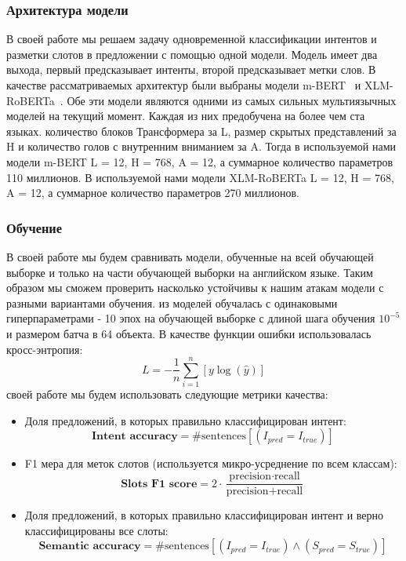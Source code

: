 \subsubsection{Архитектура модели}
В своей работе мы решаем задачу одновременной классификации интентов и разметки слотов в предложении с помощью одной модели.
Модель имеет два выхода, первый предсказывает интенты, второй предсказывает метки слов.
В качестве рассматриваемых архитектур были выбраны модели m-BERT~\cite{devlin-etal-2019-bert} и XLM-RoBERTa~\cite{Conneau2020UnsupervisedCR}.
Обе эти модели являются одними из самых сильных мультиязычных моделей на текущий момент.
Каждая из них предобучена на более чем ста языках.
 количество блоков Трансформера за L, размер скрытых представлений за H и количество голов с внутренним вниманием за A\@.
Тогда в используемой нами модели m-BERT L = 12, H = 768, A = 12, а суммарное количество параметров 110 миллионов.
В используемой нами модели XLM-RoBERTa L = 12, H = 768, A = 12, а суммарное количество параметров 270 миллионов.

\subsubsection{Обучение}
В своей работе мы будем сравнивать модели, обученные на всей обучающей выборке и только на части обучающей выборки на английском языке.
Таким образом мы сможем проверить насколько устойчивы к нашим атакам модели с разными вариантами обучения.
 из моделей обучалась с одинаковыми гиперпараметрами - 10 эпох на обучающей выборке с длиной шага обучения $10^{-5}$ и размером батча в 64 объекта.
В качестве функции ошибки использовалась кросс-энтропия:
\begin{equation}
    L = -\dfrac{1}{n}\sum\limits_{i = 1}^{n}\left[ y\log\left(\hat{y}\right) \right]\label{eq:equation4}
\end{equation}
 своей работе мы будем использовать следующие метрики качества:
\begin{itemize}
    \item Доля предложений, в которых правильно классифицирован интент:
    \begin{equation}
        \textbf{Intent accuracy} = \# \text{sentences} \left[ \left(I_{pred} = I_{true} \right) \right]\label{eq:equation}
    \end{equation}
    \item F1 мера для меток слотов (используется микро-усреднение по всем классам):
    \begin{equation}
        \textbf{Slots F1 score} = 2 \cdot \dfrac{\text{precision} \cdot \text{recall}}{\text{precision} + \text{recall}}\label{eq:equation2}
    \end{equation}
    \item Доля предложений, в которых правильно классифицирован интент и верно классифицированы все слоты:
    \begin{equation}
        \textbf{Semantic accuracy} = \# \text{sentences} \left[ \left(I_{pred} = I_{true} \right) \land \left(S_{pred} = S_{true} \right)\right]\label{eq:equation3}
    \end{equation}
\end{itemize}

